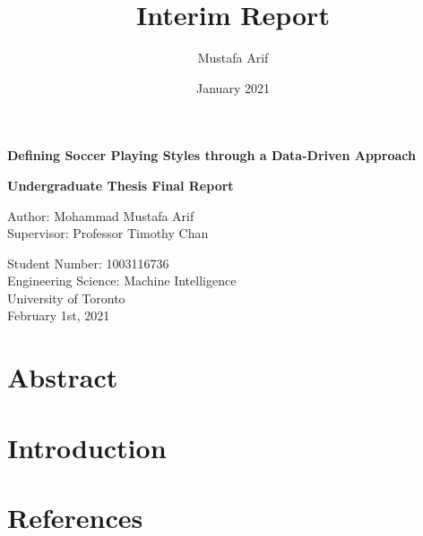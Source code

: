 \documentclass[a4paper,12pt]{article}
\title{Interim Report}
\author{Mustafa Arif}
\date{January 2021}
\begin{document}
\begin{titlepage}
    \begin{center}
        \vspace*{1cm}
            
        \Huge
        \textbf{Defining Soccer Playing Styles through a Data-Driven Approach}
            
        \vspace{0.5cm}
        \Large
        \textbf{Undergraduate Thesis Final Report}
            
        \vspace{1.5cm}
            
        Author: Mohammad Mustafa Arif\\
        Supervisor: Professor Timothy Chan
            
        \vfill
            
            
        \vspace{0.8cm}
            
            
        \large
        Student Number: 1003116736 \\
        Engineering Science: Machine Intelligence\\
        University of Toronto\\
        February 1st, 2021
            
    \end{center}
\end{titlepage}


\tableofcontents
\newpage


\section{Abstract}

\section{Introduction}





\newpage
\section{References}
\printbibliography[heading=none]
\end{document}
